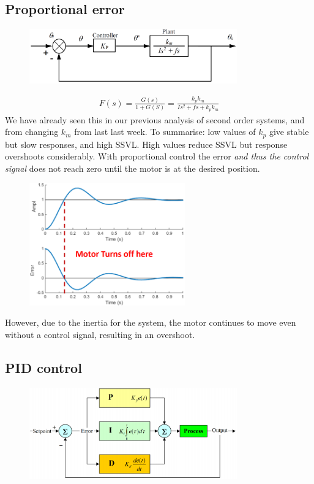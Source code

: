 \documentclass[class=report, crop=false, 12pt,a4paper]{standalone}
\begin{document}
\subsection{Proportional error}
\begin{figure}[H]
  \centerline{\includegraphics[width = 0.8\textwidth]{../img/diagram118.png}}
  \caption{}
\end{figure}
\begin{gather}
  F(s) = \frac{G(s)}{1+ G(S)} = \frac{k_p k_m}{Is^2 + fs + k_p k_m}
\end{gather}
We have already seen this in our previous analysis of second order systems, and from changing $k_m$ from last last week. To summarise: low values of $k_p$ give stable but slow responses, and high SSVL. High values reduce SSVL but response overshoots considerably. With proportional control the error \textit{and thus the control signal} does not reach zero until the motor is at the desired position.
\begin{figure}[H]
  \centerline{\includegraphics[width = 0.6\textwidth]{../img/diagram119.png}}
  \caption{}
\end{figure}
However, due to the inertia for the system, the motor continues to move even without a control signal, resulting in an overshoot.
\subsection{PID control}
\begin{figure}[H]
  \centerline{\includegraphics[width = 0.8\textwidth]{../img/diagram120.png}}
  \caption{}
\end{figure}
\end{document}
